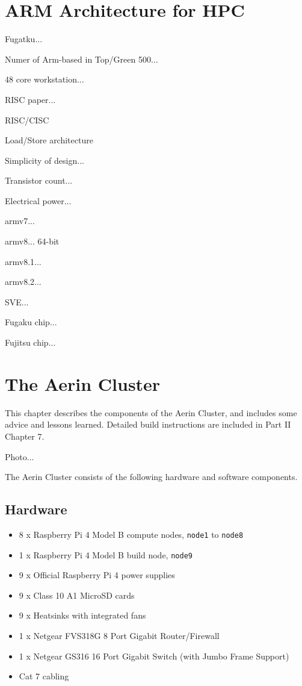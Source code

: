 \documentclass{report}
\begin{document}
%
%
\chapter{ARM Architecture for HPC}

Fugatku...

Numer of Arm-based in Top/Green 500...

48 core workstation...

RISC paper...

RISC/CISC

Load/Store architecture

Simplicity of design...

Transistor count...

Electrical power...

armv7...

armv8... 64-bit

armv8.1...

armv8.2...

SVE...

Fugaku chip...

Fujitsu chip... 



%
%
\chapter{The Aerin Cluster}


This chapter describes the components of the Aerin Cluster, and includes some advice and lessons learned. Detailed build instructions are included in Part II Chapter 7. 

Photo...

The Aerin Cluster consists of the following hardware and software components.
%
%
\section{Hardware}

\begin{itemize}
  \item 8 x Raspberry Pi 4 Model B compute nodes, \verb|node1| to \verb|node8|
  \item 1 x Raspberry Pi 4 Model B build node, \verb|node9|
  \item 9 x Official Raspberry Pi 4 power supplies
  \item 9 x Class 10 A1 MicroSD cards
  \item 9 x Heatsinks with integrated fans
  \item 1 x Netgear FVS318G 8 Port Gigabit Router/Firewall
  \item 1 x Netgear GS316 16 Port Gigabit Switch (with Jumbo Frame Support)
  \item Cat 7 cabling
\end{itemize}
\end{document}
